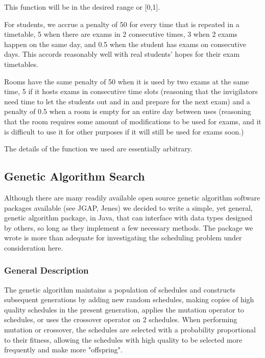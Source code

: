 \documentclass[letterpaper]{article}
\begin{document}
    This function will be in the desired range or [0,1].
    
    For students, we accrue a penalty of 50 for every time that is repeated in a 
    timetable, 5 when there are exams in 2 consecutive times, 3 when 2 exams happen 
    on the same day, and 0.5 when the student has exams on consecutive days. This 
    accords reasonably well with real students' hopes for their exam timetables.
    
    Rooms have the same penalty of 50 when it is used by two exams at the same time, 
    5 if it hosts exams in consecutive time slots (reasoning that the invigilators 
    need time to let the students out and in and prepare for the next exam) and a 
    penalty of 0.5 when a room is empty for an entire day between uses (reasoning 
    that the room requires some amount of modifications to be used for exams, and 
    it is difficult to use it for other purposes if it will still be used for exams 
    soon.)
    
    The details of the function we used are essentially arbitrary.
    
  \subsection{Genetic Algorithm Search}
    Although there are many readily available open source genetic algorithm software
    packages available (see JGAP, Jenes) we 
    decided to write a simple, yet general, genetic algorithm package, in Java, that
    can interface with data types designed by others, so long as they implement a few
    necessary methods. The package we wrote is more than adequate for investigating
    the scheduling problem under consideration here.
    
    \subsubsection{General Description}
      The genetic algorithm maintains a population of schedules and constructs subsequent
      generations by adding new random schedules, making copies of high quality schedules 
      in the present generation, applies the mutation operator to schedules, or uses the
      crossover operator on 2 schedules. When performing mutation or crossover, the 
      schedules are selected with a probability proportional to their fitness, allowing 
      the schedules with high quality to be selected more frequently and make more 
      "offspring". 
      
\end{document}
